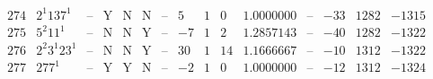 \documentclass[11pt,reqno,a4letter]{article}
\numberwithin{figure}{section}
\numberwithin{table}{section}
\theoremstyle{plain}
\numberwithin{theorem}{section}
\theoremstyle{definition}
\begin{document}
\begin{table}[h!]
\begin{equation*}
{\begin{array}{|cc|c|ccc|c|c|ccc|c|ccc}
 274 & 2^1 137^1 & \text{--} & \text{Y} & \text{N} & \text{N} & \text{--} & 5 & 1 & 0 & 1.0000000 & \text{--} & -33 & 1282 & -1315 \\
 275 & 5^2 11^1 & \text{--} & \text{N} & \text{N} & \text{Y} & \text{--} & -7 & 1 & 2 & 1.2857143 & \text{--} & -40 & 1282 & -1322 \\
 276 & 2^2 3^1 23^1 & \text{--} & \text{N} & \text{N} & \text{Y} & \text{--} & 30 & 1 & 14 & 1.1666667 & \text{--} & -10 & 1312 & -1322 \\
 277 & 277^1 & \text{--} & \text{Y} & \text{Y} & \text{N} & \text{--} & -2 & 1 & 0 & 1.0000000 & \text{--} & -12 & 1312 & -1324 \\
\end{array}
}
\end{equation*}

\end{table} 
\end{document}
